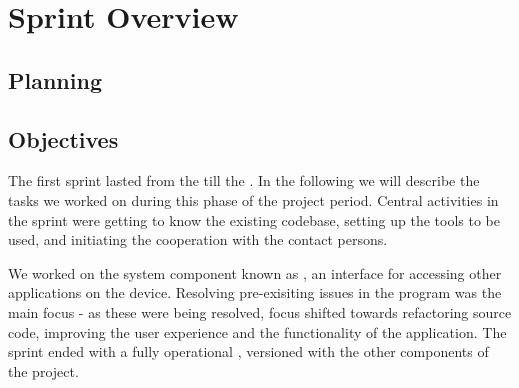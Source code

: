 \chapter{Sprint Overview}

\section{Planning}

\section{Objectives}
The first sprint lasted from the  till the .
In the following we will describe the tasks we worked on during this phase of the project period. 
Central activities in the sprint were getting to know the existing codebase, setting up the tools to be used, and initiating the cooperation with the contact persons.

We worked on the system component known as \textit{\launcher}, an interface for accessing other \giraf applications on the device.
Resolving pre-exisiting issues in the program was the main focus - as these were being resolved, focus shifted towards refactoring source code, improving the user experience and the functionality of the application.
The sprint ended with a fully operational \launcher, versioned with the other components of the project.
